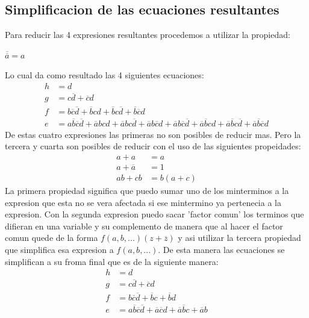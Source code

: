 \documentclass{article}
\begin{document}
	\subsection{Simplificacion de las ecuaciones resultantes}
		\hspace{10mm} Para reducir las 4 expresiones resultantes procedemos a utilizar la propiedad:
		\newline \centerline{$\overline{\overline{a}}=a$}
		Lo cual da como resultado las 4 siguientes ecuaciones:
			\begin{align*}
				h & = d\\
				g & = c\overline{d}+\overline{c}d\\
				f & = b\overline{c}\overline{d}+\overline{b}cd+\overline{b}c\overline{d}+\overline{b}\overline{c}d\\
				e & = a\overline{b}\overline{c}\overline{d}+\overline{a}bcd+\overline{a}bc\overline{d}+\overline{a}b\overline{c}d+\overline{a}b\overline{c}\overline{d}+\overline{a}\overline{b}cd+\overline{a}\overline{b}c\overline{d}+\overline{a}\overline{b}\overline{c}d
			\end{align*}
			De estas cuatro expresiones las primeras no son posibles de reducir mas. Pero la tercera y cuarta son posibles de reducir con el uso de las siguientes propeidades:
			\begin{align*}
				a+a & = a\\
				a+\overline{a} & = 1\\
				ab+cb & = b(a+c)
			\end{align*} 
			La primera propiedad significa que puedo sumar uno de los minterminos a la expresion que esta no se vera afectada si ese mintermino ya pertenecia a la expresion. Con la segunda expresion puedo sacar 'factor comun' los terminos que difieran en una variable y su complemento de manera que al hacer el factor comun quede de la forma $f(a,b,...)(z+\overline{z})$ y asi utilizar la tercera propiedad que simplifica esa expresion a $f(a,b,...)$. De esta manera las ecuaciones se simplifican a su froma final que es de la siguiente manera:
			\begin{align*}
				h & = d\\
				g & = c\overline{d}+\overline{c}d\\
				f & = b\overline{c}\overline{d}+\overline{b}c+\overline{b}d\\
				e & = a\overline{b}\overline{c}\overline{d}+\overline{a}\overline{c}d+\overline{a}\overline{b}c+\overline{a}b
			\end{align*}
\end{document}
